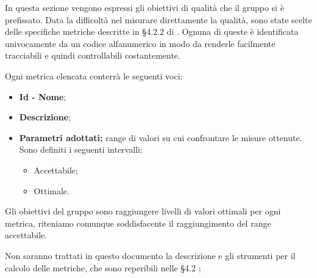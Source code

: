 In questa sezione vengono espressi gli obiettivi di qualità che il gruppo \gruppo \space  si è prefissato. 
Data la difficoltà nel misurare direttamente la qualità, sono state scelte delle specifiche metriche descritte in §4.2.2 di \NdP. 
Ognuna di queste è identificata univocamente da un codice alfanumerico in modo da renderle facilmente tracciabili e quindi controllabili costantemente.

Ogni metrica elencata conterrà le seguenti voci:
\begin{itemize}
	\item \textbf{Id - Nome};
	\item \textbf{Descrizione};
	\item \textbf{Parametri adottati: }range di valori su cui confrontare le misure ottenute. Sono definiti i seguenti intervalli:
	\begin{itemize}
		\item Accettabile;
		\item Ottimale.
	\end{itemize}		
	
\end{itemize}

Gli obiettivi del gruppo sono raggiungere livelli di valori ottimali per ogni metrica, 
riteniamo comunque soddisfacente
il raggiungimento del range accettabile.

Non saranno trattati in questo documento la descrizione e gli strumenti per il calcolo delle metriche,
 che sono reperibili nelle \NdP \space §4.2 ;
